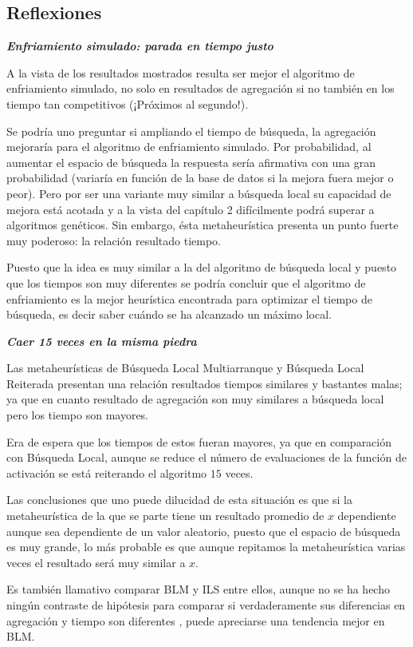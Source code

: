\subsection*{Reflexiones}

\textbf{\textit{Enfriamiento simulado: parada en tiempo justo}}

A la vista de los resultados mostrados resulta 
ser mejor el algoritmo de enfriamiento simulado,
no solo en resultados de agregación si no también en los tiempo tan competitivos
(¡Próximos al segundo!). 

Se podría uno preguntar si ampliando el tiempo de búsqueda,
la agregación mejoraría para el algoritmo de enfriamiento simulado. 
Por probabilidad, al aumentar el espacio de búsqueda la respuesta sería afirmativa con una gran probabilidad
(variaría en función de la base de datos si la mejora fuera mejor o peor). Pero por ser una 
variante muy similar a búsqueda local su capacidad 
de mejora está acotada y a la vista del capítulo 2 
difícilmente podrá superar a algoritmos genéticos. 
Sin embargo, ésta metaheurística presenta un punto fuerte 
muy poderoso: la relación resultado tiempo. 

Puesto que la idea es muy similar a la del algoritmo de búsqueda local y puesto que los tiempos son muy diferentes se podría concluir que 
el algoritmo de enfriamiento es la mejor heurística 
encontrada para optimizar el tiempo de búsqueda, 
es decir saber cuándo se ha alcanzado un máximo local. 

\textbf{\textit{Caer 15 veces en la misma piedra}}


Las metaheurísticas de Búsqueda Local Multiarranque y Búsqueda Local Reiterada presentan una relación 
resultados tiempos similares y bastantes malas; ya que en cuanto 
resultado de agregación son muy similares a búsqueda local 
pero los tiempo son mayores.

Era de espera que los tiempos de estos fueran mayores, ya que en comparación con Búsqueda Local,
aunque se reduce el número de evaluaciones de la 
función de activación se está reiterando el 
algoritmo $15$ veces.  

Las conclusiones que uno puede dilucidad de esta situación es que si la metaheurística de la que se parte tiene un resultado promedio de $x$ dependiente aunque sea dependiente de un valor aleatorio, puesto que el espacio de búsqueda es muy grande, lo más probable es que aunque repitamos la metaheurística varias veces el resultado será muy 
similar a $x$. 

Es también llamativo comparar BLM y ILS entre ellos, aunque no se ha hecho ningún contraste de hipótesis para comparar si verdaderamente sus diferencias en agregación y tiempo son diferentes , 
puede apreciarse una tendencia mejor en BLM.


